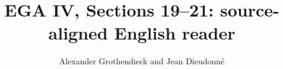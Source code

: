 
\setlength{\emergencystretch}{3em}



\title{EGA IV, Sections 19--21: source-aligned English reader}
\author{Alexander Grothendieck and Jean Dieudonn\'e}
\date{}
\maketitle
\tableofcontents

\setcounter{section}{18}










